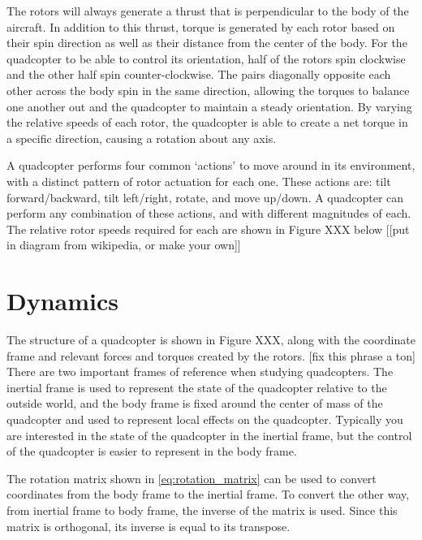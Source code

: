 \documentclass[letterpaper,12pt,titlepage,oneside,final]{book}
\begin{document}
The rotors will always generate a thrust that is perpendicular to the body of the aircraft. 
In addition to this thrust, torque is generated by each rotor based on their spin direction  as well as their distance from the center of the body.
For the quadcopter to be able to control its orientation, half of the rotors spin clockwise and the other half spin counter-clockwise. 
The pairs diagonally opposite each other across the body spin in the same direction, allowing the torques to balance one another out and the quadcopter to maintain a steady orientation. 
By varying the relative speeds of each rotor, the quadcopter is able to create a net torque in a specific direction, causing a rotation about any axis.

A quadcopter performs four common ‘actions’ to move around in its environment, with a distinct pattern of rotor actuation for each one. 
These actions are: tilt forward/backward, tilt left/right, rotate, and move up/down. 
A quadcopter can perform any combination of these actions, and with different magnitudes of each. The relative rotor speeds required for each are shown in Figure XXX below [[put in diagram from wikipedia, or make your own]]



\section{Dynamics}


The structure of a quadcopter is shown in Figure XXX, along with the coordinate frame and relevant forces and torques created by the rotors.
[fix this phrase a ton] There are two important frames of reference when studying quadcopters. The inertial frame is used to represent the state of the quadcopter relative to the outside world, and the body frame is fixed around the center of mass of the quadcopter and used to represent local effects on the quadcopter.
Typically you are interested in the state of the quadcopter in the inertial frame, but the control of the quadcopter is easier to represent in the body frame. 


The rotation matrix shown in \eqref{eq:rotation_matrix} can be used to convert coordinates from the body frame to the inertial frame. 
To convert the other way, from inertial frame to body frame, the inverse of the matrix is used. 
Since this matrix is orthogonal, its inverse is equal to its transpose.
\end{document}
